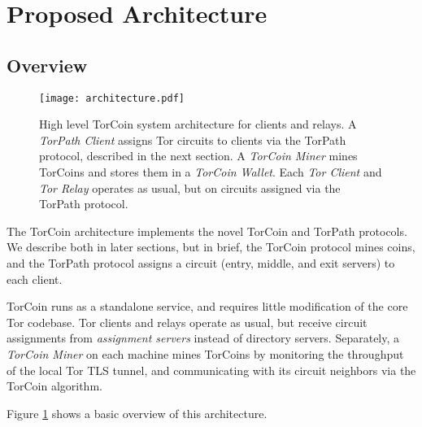 \section{Proposed Architecture} \label{arch}

\subsection{Overview}

\begin{figure}
  \centering
    \texttt{[image: architecture.pdf]}
  \caption{High level TorCoin system architecture for clients and relays. A \textit{TorPath Client} assigns Tor circuits to clients via the TorPath protocol, described in the next section. A \textit{TorCoin Miner} mines TorCoins and stores them in a \textit{TorCoin Wallet}. Each \textit{Tor Client} and \textit{Tor Relay} operates as usual, but on circuits assigned via the TorPath protocol.}
  \label{figure:archi}
\end{figure}

The TorCoin architecture implements the novel TorCoin and TorPath protocols. We
describe both in later sections, but in brief, the TorCoin protocol mines
coins, and the TorPath protocol assigns a circuit (entry, middle, and exit
servers) to each client.

TorCoin runs as a standalone service, and requires little modification of
the core Tor codebase. Tor clients and relays operate as usual, but receive
circuit assignments from \textit{assignment servers} instead of directory 
servers. Separately, a \textit{TorCoin Miner} on each machine mines TorCoins
by monitoring the throughput of the local Tor TLS tunnel, and communicating with its circuit neighbors via the TorCoin algorithm.

Figure \ref{figure:archi} shows a basic overview of this architecture.




